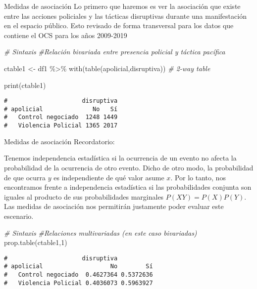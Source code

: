 \documentclass[
  8pt,
  ignorenonframetext,
]{beamer}
\newenvironment{Shaded}{\begin{snugshade}}{\end{snugshade}}
\newcommand{\CommentTok}[1]{\textcolor[rgb]{0.56,0.35,0.01}{\textit{#1}}}
\newcommand{\DecValTok}[1]{\textcolor[rgb]{0.00,0.00,0.81}{#1}}
\newcommand{\FunctionTok}[1]{\textcolor[rgb]{0.00,0.00,0.00}{#1}}
\newcommand{\NormalTok}[1]{#1}
\newcommand{\OtherTok}[1]{\textcolor[rgb]{0.56,0.35,0.01}{#1}}
\newcommand{\SpecialCharTok}[1]{\textcolor[rgb]{0.00,0.00,0.00}{#1}}
\begin{document}
\begin{frame}[fragile]{Medidas de asociación}
\protect\hypertarget{medidas-de-asociaciuxf3n-3}{}
Lo primero que haremos es ver la asociación que existe entre las
acciones policiales y las tácticas disruptivas durante una manifestación
en el espacio público. Esto revisado de forma transversal para los datos
que contiene el OCS para los años 2009-2019

\begin{Shaded}
\begin{Highlighting}[]
\CommentTok{\# Sintaxis}
\CommentTok{\#Relación bivariada entre presencia policial y táctica pacífica}

\NormalTok{ctable1 }\OtherTok{\textless{}{-}}\NormalTok{ df1 }\SpecialCharTok{\%\textgreater{}\%} \FunctionTok{with}\NormalTok{(}\FunctionTok{table}\NormalTok{(apolicial,disruptiva)) }\CommentTok{\# 2{-}way table}

\FunctionTok{print}\NormalTok{(ctable1)}
\end{Highlighting}
\end{Shaded}

\begin{verbatim}
#                     disruptiva
# apolicial              No   Sí
#   Control negociado  1248 1449
#   Violencia Policial 1365 2017
\end{verbatim}
\end{frame}

\begin{frame}[fragile]{Medidas de asociación}
\protect\hypertarget{medidas-de-asociaciuxf3n-4}{}
Recordatorio:

Tenemos independencia estadística si la ocurrencia de un evento no
afecta la probabilidad de la ocurrencia de otro evento. Dicho de otro
modo, la probabilidad de que ocurra \(y\) es independiente de qué valor
asume \(x\). Por lo tanto, nos encontramos frente a independencia
estadística si las probabilidades conjunta son iguales al producto de
sus probabilidades marginales \(P(XY) = P(X)P(Y)\). Las medidas de
asociación nos permitirán justamente poder evaluar este escenario.

\begin{Shaded}
\begin{Highlighting}[]
\CommentTok{\# Sintaxis}
\CommentTok{\#Relaciones multivariadas (en este caso bivariadas)}
\FunctionTok{prop.table}\NormalTok{(ctable1,}\DecValTok{1}\NormalTok{)}
\end{Highlighting}
\end{Shaded}

\begin{verbatim}
#                     disruptiva
# apolicial                   No        Sí
#   Control negociado  0.4627364 0.5372636
#   Violencia Policial 0.4036073 0.5963927
\end{verbatim}
\end{frame}
\end{document}

